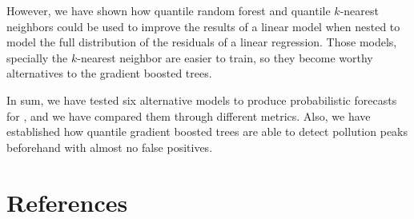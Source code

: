 \documentclass[a4paper,3p,sort&compress]{elsarticle}
\begin{document}
However, we have shown how quantile random forest and quantile
$k$-nearest neighbors could be used to improve the results of a linear
model when nested to model the full distribution of the residuals of a
linear regression. Those models, specially the $k$-nearest neighbor
are easier to train, so they become worthy alternatives to the
gradient boosted trees.

In sum, we have tested six alternative models to produce probabilistic
forecasts for \no, and we have compared them through different
metrics.  Also, we have established how quantile gradient boosted
trees are able to detect pollution peaks beforehand with almost no
false positives.


\section*{References}


\end{document}
